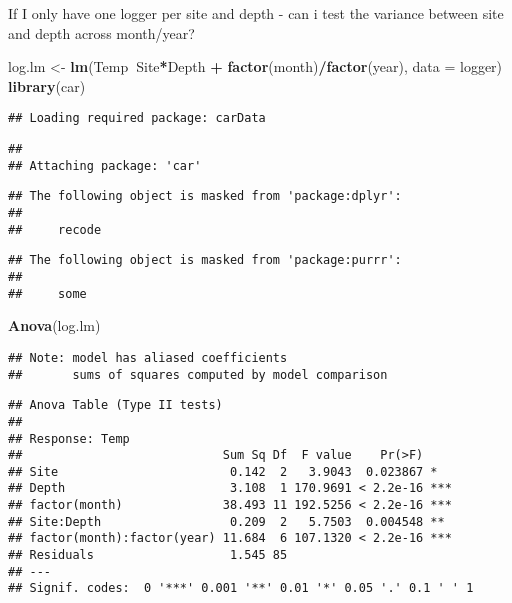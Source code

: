 \documentclass[
]{article}
\newenvironment{Shaded}{\begin{snugshade}}{\end{snugshade}}
\newcommand{\DataTypeTok}[1]{\textcolor[rgb]{0.13,0.29,0.53}{#1}}
\newcommand{\KeywordTok}[1]{\textcolor[rgb]{0.13,0.29,0.53}{\textbf{#1}}}
\newcommand{\NormalTok}[1]{#1}
\newcommand{\OperatorTok}[1]{\textcolor[rgb]{0.81,0.36,0.00}{\textbf{#1}}}
\newcommand{\StringTok}[1]{\textcolor[rgb]{0.31,0.60,0.02}{#1}}
\begin{document}
If I only have one logger per site and depth - can i test the variance
between site and depth across month/year?

\begin{Shaded}
\begin{Highlighting}[]
\NormalTok{log.lm <-}\StringTok{ }\KeywordTok{lm}\NormalTok{(Temp}\OperatorTok{~}\NormalTok{Site}\OperatorTok{*}\NormalTok{Depth }\OperatorTok{+}\StringTok{ }\KeywordTok{factor}\NormalTok{(month)}\OperatorTok{/}\KeywordTok{factor}\NormalTok{(year), }\DataTypeTok{data =}\NormalTok{ logger)}
\KeywordTok{library}\NormalTok{(car)}
\end{Highlighting}
\end{Shaded}

\begin{verbatim}
## Loading required package: carData
\end{verbatim}

\begin{verbatim}
## 
## Attaching package: 'car'
\end{verbatim}

\begin{verbatim}
## The following object is masked from 'package:dplyr':
## 
##     recode
\end{verbatim}

\begin{verbatim}
## The following object is masked from 'package:purrr':
## 
##     some
\end{verbatim}

\begin{Shaded}
\begin{Highlighting}[]
\KeywordTok{Anova}\NormalTok{(log.lm)}
\end{Highlighting}
\end{Shaded}

\begin{verbatim}
## Note: model has aliased coefficients
##       sums of squares computed by model comparison
\end{verbatim}

\begin{verbatim}
## Anova Table (Type II tests)
## 
## Response: Temp
##                            Sum Sq Df  F value    Pr(>F)    
## Site                        0.142  2   3.9043  0.023867 *  
## Depth                       3.108  1 170.9691 < 2.2e-16 ***
## factor(month)              38.493 11 192.5256 < 2.2e-16 ***
## Site:Depth                  0.209  2   5.7503  0.004548 ** 
## factor(month):factor(year) 11.684  6 107.1320 < 2.2e-16 ***
## Residuals                   1.545 85                       
## ---
## Signif. codes:  0 '***' 0.001 '**' 0.01 '*' 0.05 '.' 0.1 ' ' 1
\end{verbatim}
\end{document}
